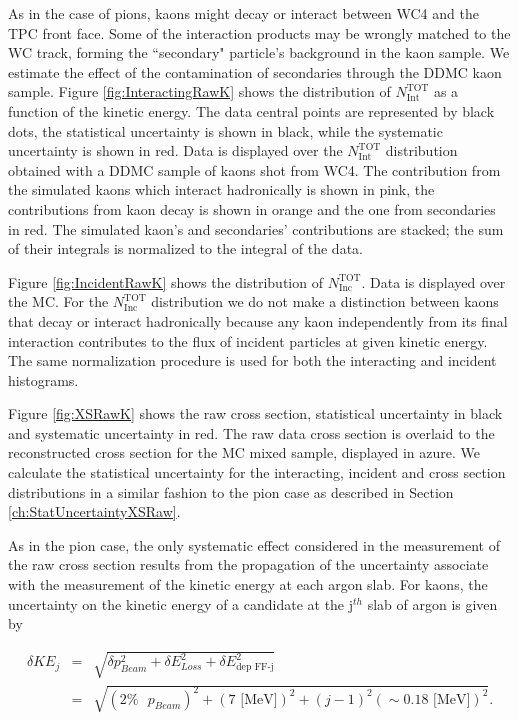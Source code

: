 As in the case of pions, kaons might decay or interact between WC4 and the TPC front face. Some of the interaction products may be wrongly matched to the WC track, forming the ``secondary" particle's background in the kaon sample. We estimate the effect of the contamination of secondaries through  the DDMC kaon sample.
Figure \ref{fig:InteractingRawK} shows the distribution of  $N^{\text{TOT}}_{\text{Int}}$  as a function of the kinetic energy. The data central points are represented by black dots, the statistical uncertainty is shown in black, while the systematic uncertainty is shown in red. Data is displayed over the $N^{\text{TOT}}_{\text{Int}}$  distribution obtained with a DDMC  sample of kaons shot from WC4.  
The contribution from the simulated kaons which interact hadronically is shown in pink, the contributions from kaon decay is shown in orange and the one from secondaries in red. 
The simulated kaon's and secondaries' contributions are stacked; the sum of their integrals is normalized to the integral of the data.
 
Figure \ref{fig:IncidentRawK} shows the distribution of  $N^{\text{TOT}}_{\text{Inc}}$. Data is displayed over the MC. For the  $N^{\text{TOT}}_{\text{Inc}}$ distribution we do not make a distinction between kaons that decay or interact hadronically because any kaon independently from its final interaction contributes to the flux of incident particles at given kinetic energy.
The same normalization procedure is used for both the interacting and incident histograms. 


Figure \ref{fig:XSRawK} shows the raw cross section, statistical uncertainty in black and systematic uncertainty in red. The raw data cross section is overlaid to the reconstructed cross section for the MC mixed sample, displayed in azure.  We calculate the statistical uncertainty for the interacting, incident and cross section distributions in a similar fashion to the pion case as described in Section \ref{ch:StatUncertaintyXSRaw}. 

As in the pion case, the only systematic effect considered in the measurement of the raw cross section results from the propagation of the uncertainty associate with the measurement of the kinetic energy at each argon slab. For kaons, the uncertainty on the kinetic energy of a candidate at the j$^{th}$ slab of argon  is given by

\begin{eqnarray}
\delta KE_{j} &=& \sqrt{\delta p_{Beam}^2 + \delta E_{Loss}^2 +  \delta  E_{\text{dep FF-j}}^2}\\
&=& \sqrt{(2\% \text{ }p_{Beam})^2 +  (7 \text{ [MeV]})^2 +  (j-1)^2 (\sim0.18\text{ [MeV]})^2}.
\end{eqnarray}

